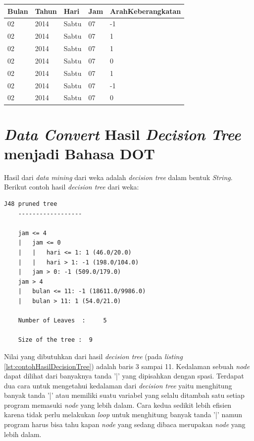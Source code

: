 \begin{table}[H]
\centering
\caption{Contoh hasil data transformasi latitude longitude}
\label{table:contohHasilDataTransformasiLatLong}
\begin{longtable}{|l|l|l|l|l|}
\hline
\textbf{Bulan}	& \textbf{Tahun} 	& \textbf{Hari} & \textbf{Jam}	& \textbf{ArahKeberangkatan} \\ \hline
02								& 2014						& Sabtu         & 07         	& -1                    \\ \hline
02								& 2014						& Sabtu         & 07         	& 1        					  \\ \hline
02								& 2014						& Sabtu         & 07         	& 1       							\\ \hline
02								& 2014						& Sabtu         & 07         	& 0         						\\ \hline
02								& 2014						& Sabtu         & 07         	& 1          					\\ \hline
02								& 2014						& Sabtu         & 07         	& -1      							\\ \hline
02								& 2014						& Sabtu         & 07         	& 0       							\\ \hline
\end{longtable}
\end{table} 

\section{\textsl{Data Convert} Hasil \textsl{Decision Tree} menjadi Bahasa DOT}

Hasil dari \textsl{data mining} dari weka adalah \textsl{decision tree} dalam bentuk \textsl{String}. Berikut contoh hasil \textsl{decision tree} dari weka:

\begin{lstlisting}[caption={Contoh Hasil \textsl{Decision Tree}},label={lst:contohHasilDecisionTree}]
	J48 pruned tree
	------------------
	
	jam <= 4
	|   jam <= 0
	|   |   hari <= 1: 1 (46.0/20.0)
	|   |   hari > 1: -1 (198.0/104.0)
	|   jam > 0: -1 (509.0/179.0)
	jam > 4
	|   bulan <= 11: -1 (18611.0/9986.0)
	|   bulan > 11: 1 (54.0/21.0)
	
	Number of Leaves  : 	5
	
	Size of the tree : 	9
\end{lstlisting}

Nilai yang dibutuhkan dari hasil \textsl{decision tree} (pada \textsl{listing} \ref{lst:contohHasilDecisionTree}) adalah baris 3 sampai 11. Kedalaman sebuah \textsl{node} dapat dilihat dari banyaknya tanda '|' yang dipisahkan dengan spasi. Terdapat dua cara untuk mengetahui kedalaman dari \textsl{decision tree} yaitu menghitung banyak tanda '|' atau memiliki suatu variabel yang selalu ditambah satu setiap program memasuki \textsl{node} yang lebih dalam. Cara kedua sedikit lebih efisien karena tidak perlu melakukan \textsl{loop} untuk menghitung banyak tanda '|' namun program harus bisa tahu kapan \textsl{node} yang sedang dibaca merupakan \textsl{node} yang lebih dalam. 

